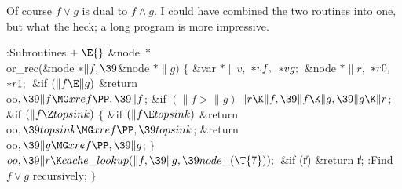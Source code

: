 Of course $f\lor g$ is dual to $f\land g$. I could have combined
the two routines into one, but what the heck; a long program is more
impressive.

\Y\B\4:Subroutines\X${}\mathrel+\E{}$\6
\&{node} ${}{*}{}$\\{or\_rec}(\&{node} ${}{*}\|f,\39{}$\&{node} ${}{*}\|g){}$\1%
\1\2\2\6
${}\{{}$\1\6
\&{var} ${}{*}\|v,{}$ ${}{*}\\{vf},{}$ ${}{*}\\{vg};{}$\6
\&{node} ${}{*}\|r,{}$ ${}{*}\\{r0},{}$ ${}{*}\\{r1};{}$\7
\&{if} ${}(\|f\E\|g){}$\1\5
\&{return} \\{oo}${},\39\|f\MG\\{xref}\PP,\39\|f{}$;\2\6
\&{if} ${}(\|f>\|g){}$\1\5
${}\|r\K\|f,\39\|f\K\|g,\39\|g\K\|r{}$;\2\6
\&{if} ${}(\|f\Z\\{topsink}){}$\5
${}\{{}$\1\6
\&{if} ${}(\|f\E\\{topsink}){}$\1\5
\&{return} \\{oo}${},\39\\{topsink}\MG\\{xref}\PP,\39\\{topsink}{}$;\2\6
\&{return} \\{oo}${},\39\|g\MG\\{xref}\PP,\39\|g{}$;\6
\4${}\}{}$\2\6
${}\\{oo},\39\|r\K\\{cache\_lookup}(\|f,\39\|g,\39\\{node\_}(\T{7}));{}$\6
\&{if} (\|r)\1\5
\&{return} \|r;\2\6
:Find $f\lor g$ recursively\X;\6
\4${}\}{}$\2\par
\fi


